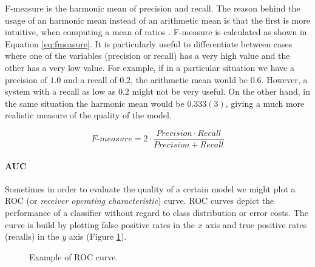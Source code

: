F-measure is the harmonic mean of precision and recall. The reason behind the
usage of an harmonic mean instead of an arithmetic mean is that the first is
more intuitive, when computing a mean of ratios \cite{Sasaki2007}. F-measure is
calculated as shown in Equation \ref{eq:fmeasure}. It is particularly useful to
differentiate between cases where one of the variables (precision or recall) has
a very high value and the other has a very low value. For example, if in a
particular situation we have a precision of $1.0$ and a recall of $0.2$, the
arithmetic mean would be $0.6$. However, a system with a recall as low as $0.2$
might not be very useful. On the other hand, in the same situation the harmonic
mean would be $0.333(3)$, giving a much more realistic measure of the quality of
the model.

\begin{equation}
  \textit{F-measure}=2 \cdot \frac{\mathit{Precision} \cdot
  \mathit{Recall}}{\mathit{Precision}+\mathit{Recall}} \label{eq:fmeasure}
\end{equation}

\paragraph{AUC}

Sometimes in order to evaluate the quality of a certain model we might plot a
ROC (or \textit{receiver operating characteristic}) curve. ROC curves depict the
performance of a classifier without regard to class distribution or error
costs. The curve is build by plotting false positive rates in the $x$ axis and
true positive rates (recalls) in the $y$ axis (Figure \ref{fig:roccurve}).

\begin{figure}[ht]
  \begin{center}
    \caption[Example of ROC curve]{Example of ROC curve.}
    \label{fig:roccurve}
  \end{center}
\end{figure}

